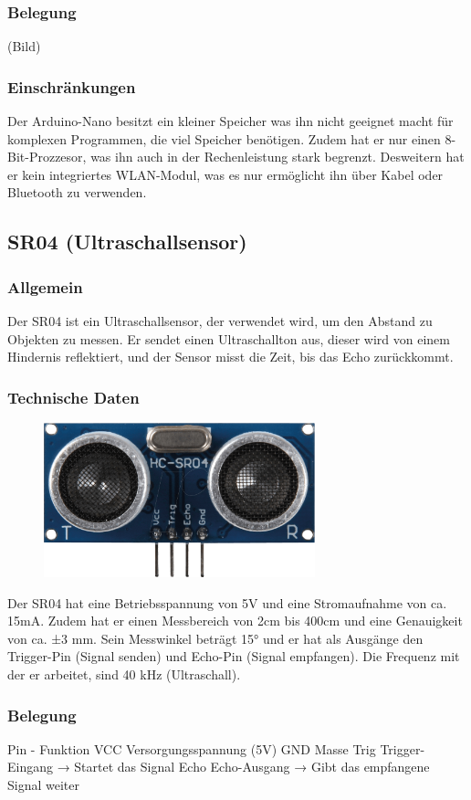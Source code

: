 \subsubsection{Belegung}
(Bild)
\subsubsection{Einschränkungen}
Der Arduino-Nano besitzt ein kleiner Speicher was ihn  nicht geeignet macht für komplexen Programmen, die viel Speicher benötigen. 
Zudem hat er nur einen 8-Bit-Prozzesor, was ihn auch in der Rechenleistung stark begrenzt. Desweitern hat er kein integriertes WLAN-Modul, 
was es nur ermöglicht ihn  über Kabel oder Bluetooth zu verwenden.
%
\subsection{SR04 (Ultraschallsensor)}
%
\subsubsection{Allgemein}
Der SR04 ist ein Ultraschallsensor, der verwendet wird, um den Abstand zu Objekten zu messen. 
Er sendet einen Ultraschallton aus, dieser wird von einem Hindernis reflektiert, und der Sensor misst die Zeit, bis das Echo zurückkommt.
\subsubsection{Technische Daten}
\begin{figure}[H]
    \includegraphics[width=0.7\textwidth, center]{img/Hardware/sr04.png}
\end{figure}
Der SR04 hat eine Betriebsspannung von 5V und eine Stromaufnahme von ca. 15mA. 
Zudem hat er einen Messbereich von 2cm bis 400cm und eine Genauigkeit von ca. ±3 mm. 
Sein Messwinkel beträgt 15° und er hat als Ausgänge den Trigger-Pin (Signal senden) und Echo-Pin (Signal empfangen). 
Die Frequenz mit der er arbeitet, sind 40 kHz (Ultraschall).
\subsubsection{Belegung}
Pin  -   	Funktion
VCC	Versorgungsspannung (5V)
GND	Masse
Trig	Trigger-Eingang → Startet das Signal
Echo	Echo-Ausgang → Gibt das empfangene Signal weiter
